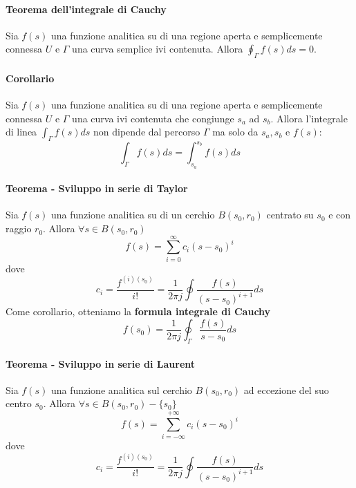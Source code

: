 \documentclass[11pt]{article}
\begin{document}
\paragraph{Teorema dell'integrale di Cauchy}
Sia $f(s)$ una funzione analitica su di una regione aperta e semplicemente connessa $U$ e $\Gamma$ una curva semplice ivi contenuta. Allora $\oint_\Gamma f(s) ds = 0$.
\paragraph{Corollario}
Sia $f(s)$ una funzione analitica su di una regione aperta e semplicemente connessa $U$ e $\Gamma$ una curva ivi contenuta che congiunge $s_a$ ad $s_b$. Allora l'integrale di linea $\int_\Gamma f(s)ds$ non dipende dal percorso $\Gamma$ ma solo da $s_a, s_b$ e $f(s)$:
\begin{displaymath}
    \int_\Gamma f(s)ds = \int_{s_a}^{s_b} f(s)ds
\end{displaymath}
\paragraph{Teorema - Sviluppo in serie di Taylor}
Sia $f(s)$ una funzione analitica su di un cerchio $B(s_0, r_0)$ centrato su $s_0$ e con raggio $r_0$. Allora $\forall s \in B(s_0, r_0)$
\begin{displaymath}
    f(s) = \sum_{i=0}^\infty c_i (s-s_0)^i
\end{displaymath}
dove
\begin{displaymath}
    c_i = \frac{f^{(i) (s_0)}}{i!} = \frac{1}{2\pi j}\oint \frac{f(s)}{(s-s_0)^{i+1}}ds
\end{displaymath}
Come corollario, otteniamo la \textbf{formula integrale di Cauchy}
\begin{displaymath}
    f(s_0) = \frac{1}{2\pi j} \oint_\Gamma \frac{f(s)}{s-s_0} ds
\end{displaymath}
\paragraph{Teorema - Sviluppo in serie di Laurent}
Sia $f(s)$ una funzione analitica sul cerchio $B(s_0, r_0)$ ad eccezione del suo centro $s_0$. Allora $\forall s \in B(s_0, r_0)- \{s_0\}$
\begin{displaymath}
    f(s) = \sum_{i=-\infty}^{+\infty} c_i(s-s_0)^i
\end{displaymath}
dove
\begin{displaymath}
    c_i = \frac{f^{(i) (s_0)}}{i!} = \frac{1}{2\pi j}\oint \frac{f(s)}{(s-s_0)^{i+1}}ds
\end{displaymath}
\end{document}
